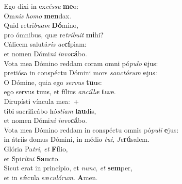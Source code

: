 \evenverse Ego dixi in ex\textit{cés}\textit{su} \textbf{me}o:~\*\\
\evenverse Om\textit{nis} \textit{ho}\textit{mo} \textbf{men}dax.\\
\oddverse Quid retrí\textit{bu}\textit{am} \textbf{Dó}mino,~\*\\
\oddverse pro ómnibus, quæ re\textit{trí}\textit{bu}\textit{it} \textbf{mi}hi?\\
\evenverse Cálicem salutá\textit{ris} \textit{ac}\textbf{cí}piam:~\*\\
\evenverse et nomen Dómi\textit{ni} \textit{in}\textit{vo}\textbf{cá}bo.\\
\oddverse Vota mea Dómino reddam coram omni pó\textit{pu}\textit{lo} \textbf{e}jus:~\*\\
\oddverse pretiósa in conspéctu Dómini mors \textit{san}\textit{ctó}\textit{rum} \textbf{e}jus:\\
\evenverse O Dómine, quia ego \textit{ser}\textit{vus} \textbf{tu}us:~\*\\
\evenverse ego servus tuus, et fílius \textit{an}\textit{cíl}\textit{læ} \textbf{tu}æ.\\
\oddverse Dirupísti víncula mea:~+\\
\oddverse  tibi sacrificábo hó\textit{sti}\textit{am} \textbf{lau}dis,~\*\\
\oddverse et nomen Dómi\textit{ni} \textit{in}\textit{vo}\textbf{cá}bo.\\
\evenverse Vota mea Dómino reddam in conspéctu omnis pó\textit{pu}\textit{li} \textbf{e}jus:~\*\\
\evenverse in átriis domus Dómini, in médio \textit{tu}\textit{i}, \textit{Je}\textbf{rú}salem.\\
\oddverse Glória Pa\textit{tri}, \textit{et} \textbf{Fí}lio,~\*\\
\oddverse et Spi\textit{rí}\textit{tu}\textit{i} \textbf{San}cto.\\
\evenverse Sicut erat in princípio, et \textit{nunc}, \textit{et} \textbf{sem}per,~\*\\
\evenverse et in sǽcula sæ\textit{cu}\textit{ló}\textit{rum}. \textbf{A}men.\\
